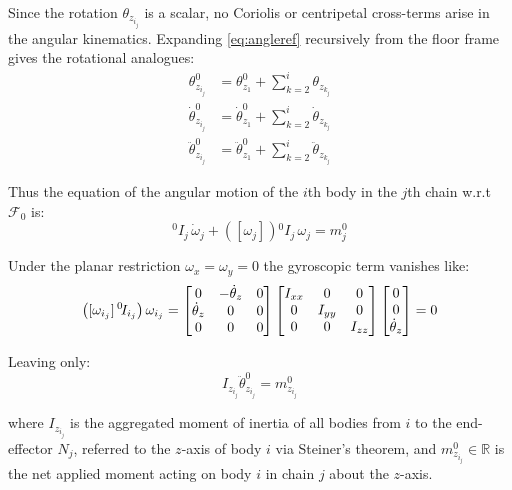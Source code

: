 \documentclass[11pt]{article}
\theoremstyle{definition}
\begin{document}
Since the rotation $\theta_{z_{i_j}}$ is a scalar, no Coriolis or centripetal cross-terms arise in the angular kinematics. Expanding \eqref{eq:angleref} recursively from the floor frame gives the rotational analogues:
\begin{align}
    \theta^{0}_{z_{i_j}}
        &= \theta^{0}_{z_1} + \sum^{i}_{k=2} \theta_{z_{k_j}}
        \label{eq:angle_expanded} \\
    \dot{\theta}^{0}_{z_{i_j}}
        &= \dot{\theta}^{0}_{z_1} + \sum^{i}_{k=2} \dot{\theta}_{z_{k_j}}
        \label{eq:angvel_expanded} \\
    \ddot{\theta}^{0}_{z_{i_j}}
        &= \ddot{\theta}^{0}_{z_1} + \sum^{i}_{k=2} \ddot{\theta}_{z_{k_j}}
        \label{eq:angacc_expanded}
\end{align}

Thus the equation of the angular motion of the $i$th body in the $j$th chain w.r.t $\mathcal{F}_{0}$ is:
\begin{equation}
    {}^{0}\!I_j \, \dot{\omega}_j + \left( [\omega_j] \right) {}^{0}\!I_j \, \omega_j  = m_j^0
\end{equation}

Under the planar restriction $\omega_x = \omega_y = 0$ the gyroscopic term vanishes like:
\begin{equation}
    \left([\omega_{i_j}]\,{}^0\!I_{i_j}\right)\omega_{i_j}
    =
    \begin{bmatrix}
        0 & -\dot{\theta}_z & 0 \\
        \dot{\theta}_z & 0 & 0 \\
        0 & 0 & 0
    \end{bmatrix}
    \begin{bmatrix}
        I_{xx} & 0 & 0 \\
        0 & I_{yy} & 0 \\
        0 & 0 & I_{zz}
    \end{bmatrix}
    \begin{bmatrix}
        0 \\
        0 \\
        \dot{\theta}_z
    \end{bmatrix}
    = 0
    \notag
\end{equation}

Leaving only:
\begin{equation}
    I_{z_{i_j}}\ddot{\theta}^{0}_{z_{i_j}} = m^0_{z_{i_j}}
\end{equation}

where $I_{z_{i_j}}$ is the aggregated moment of inertia of all bodies from $i$ to the end-effector $N_j$, referred to the $z$-axis of body $i$ via Steiner's theorem, and $m^0_{z_{i_j}} \in \mathbb{R}$ is the net applied moment acting on body $i$ in chain $j$ about the $z$-axis.
\end{document}
